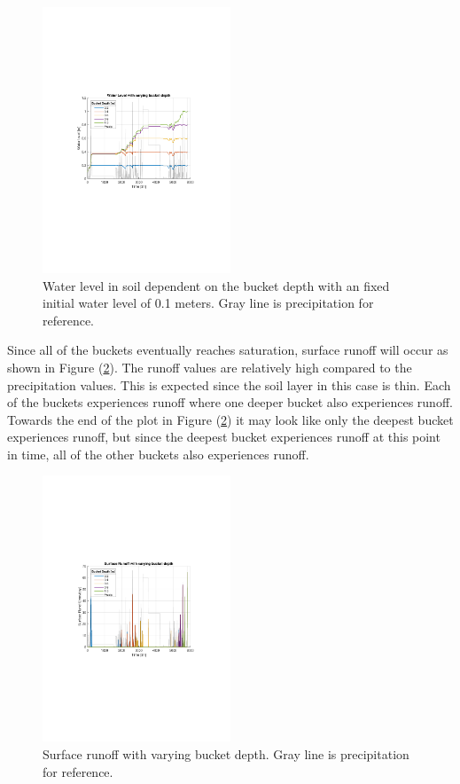 \documentclass[a4paper,11pt,twocolumn]{article}
\begin{document}
\begin{figure}[h]
	\centering 
	\includegraphics[width=0.5\textwidth]{figures/bucket_depth_fixed}
	\caption{Water level in soil dependent on the bucket depth with an fixed initial water level of 0.1 meters. Gray line is precipitation for reference.}
	\label{fig:bucket_fixed}
\end{figure}

Since all of the buckets eventually reaches saturation, surface runoff will occur as shown in Figure (\ref{fig:runoff}). The runoff values are relatively high compared to the precipitation values. This is expected since the soil layer in this case is thin. Each of the buckets experiences runoff where one deeper bucket also experiences runoff. Towards the end of the plot in Figure (\ref{fig:runoff}) it may look like only the deepest bucket experiences runoff, but since the deepest bucket experiences runoff at this point in time, all of the other buckets also experiences runoff. 

\begin{figure}[h]
	\centering 
	\includegraphics[width=0.5\textwidth]{figures/runoff}
	\caption{Surface runoff with varying bucket depth. Gray line is precipitation for reference.}
	\label{fig:runoff}
\end{figure} 
\end{document}
